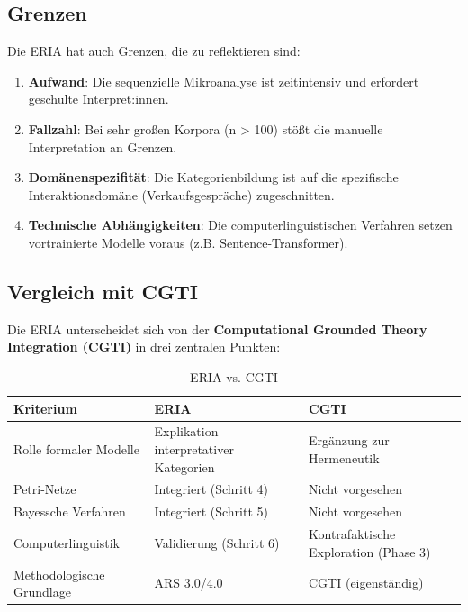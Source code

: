 \documentclass[12pt,a4paper]{article}
\begin{document}
\subsection{Grenzen}

Die ERIA hat auch Grenzen, die zu reflektieren sind:

\begin{enumerate}
    \item \textbf{Aufwand}: Die sequenzielle Mikroanalyse ist zeitintensiv und 
    erfordert geschulte Interpret:innen.
    
    \item \textbf{Fallzahl}: Bei sehr großen Korpora (n > 100) stößt die manuelle 
    Interpretation an Grenzen.
    
    \item \textbf{Domänenspezifität}: Die Kategorienbildung ist auf die 
    spezifische Interaktionsdomäne (Verkaufsgespräche) zugeschnitten.
    
    \item \textbf{Technische Abhängigkeiten}: Die computerlinguistischen Verfahren 
    setzen vortrainierte Modelle voraus (z.B. Sentence-Transformer).
\end{enumerate}

\subsection{Vergleich mit CGTI}

Die ERIA unterscheidet sich von der \textbf{Computational Grounded Theory Integration 
(CGTI)} in drei zentralen Punkten:

\begin{table}[H]
\centering
\caption{ERIA vs. CGTI}
\label{tab:vergleich}
\begin{tabular}{@{} p{4cm} p{4cm} p{4cm} @{}}
\toprule
\textbf{Kriterium} & \textbf{ERIA} & \textbf{CGTI} \\
\midrule
Rolle formaler Modelle & Explikation interpretativer Kategorien & Ergänzung zur Hermeneutik \\
Petri-Netze & Integriert (Schritt 4) & Nicht vorgesehen \\
Bayessche Verfahren & Integriert (Schritt 5) & Nicht vorgesehen \\
Computerlinguistik & Validierung (Schritt 6) & Kontrafaktische Exploration (Phase 3) \\
Methodologische Grundlage & ARS 3.0/4.0 & CGTI (eigenständig) \\
\bottomrule
\end{tabular}
\end{table}
\end{document}
